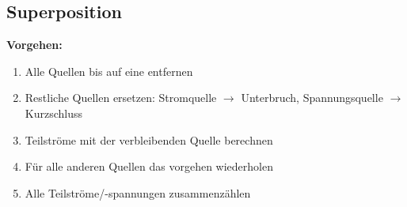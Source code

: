 \subsection{Superposition}
\textbf{Vorgehen:}
\begin{multicols}{2}
\begin{enumerate}
  \itemsep0em
  \item Alle Quellen bis auf eine entfernen
  \item Restliche Quellen ersetzen: Stromquelle $\rightarrow$ Unterbruch,
  Spannungsquelle $\rightarrow$ Kurzschluss
  \item Teilströme mit der verbleibenden Quelle berechnen
  \item Für alle anderen Quellen das vorgehen wiederholen
  \item Alle Teilströme/-spannungen zusammenzählen
\end{enumerate}
\end{multicols}